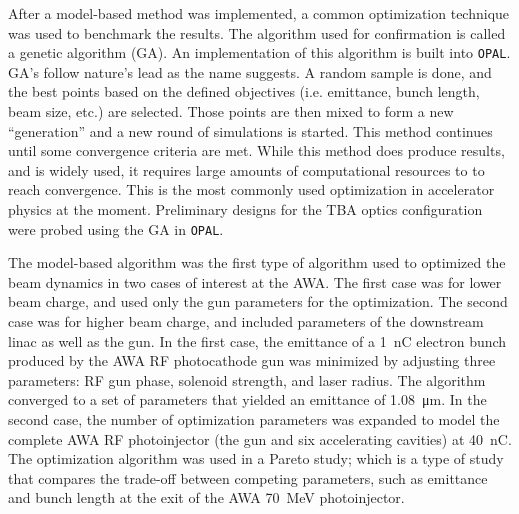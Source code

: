 After a model-based method was implemented, 
a common optimization technique was used to benchmark the results. 
The algorithm used for confirmation 
is called a genetic algorithm (GA). An implementation of this algorithm is
built into \verb|OPAL|. GA's follow nature's lead as the name suggests.
A random sample is done, and the best points based on the defined objectives
(i.e. emittance, bunch length, beam size, etc.)
are selected. Those points are then mixed to form a new ``generation''
and a new round of simulations is started. This method continues
until some convergence criteria are met. While this method does 
produce results, and is widely used, it requires large amounts 
of computational resources to to reach convergence.
This is the most commonly used optimization in accelerator physics
at the moment. Preliminary designs 
for the TBA optics configuration were probed using the GA in \verb|OPAL|. 



The model-based algorithm was the first type of algorithm used to optimized the beam dynamics 
in two cases of interest at the AWA.
The first case was for lower beam charge, and used only the gun parameters for the optimization.  
The second case was for higher beam charge, and included parameters of the downstream linac as well as the gun.
In the first case,  the emittance of a \SI{1}{nC} electron 
bunch produced by the AWA RF photocathode gun 
was minimized by adjusting three parameters: RF gun phase, 
solenoid strength, and laser radius. The algorithm 
converged to a set of parameters that yielded an
emittance of \SI{1.08}{\um}. In the second case, 
the number of optimization parameters was expanded to model the complete AWA RF 
photoinjector (the gun and six accelerating cavities) at \SI{40}{nC}. 
The optimization algorithm was used in a Pareto study; which is a type of study that compares the 
trade-off between competing parameters, such as emittance and bunch 
length at the exit of the AWA \SI{70}{MeV} photoinjector. 

